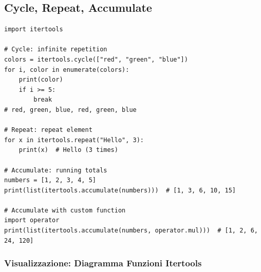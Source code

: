 \subsection{Cycle, Repeat, Accumulate}

\begin{lstlisting}
import itertools

# Cycle: infinite repetition
colors = itertools.cycle(["red", "green", "blue"])
for i, color in enumerate(colors):
    print(color)
    if i >= 5:
        break
# red, green, blue, red, green, blue

# Repeat: repeat element
for x in itertools.repeat("Hello", 3):
    print(x)  # Hello (3 times)

# Accumulate: running totals
numbers = [1, 2, 3, 4, 5]
print(list(itertools.accumulate(numbers)))  # [1, 3, 6, 10, 15]

# Accumulate with custom function
import operator
print(list(itertools.accumulate(numbers, operator.mul)))  # [1, 2, 6, 24, 120]
\end{lstlisting}

\subsubsection{Visualizzazione: Diagramma Funzioni Itertools}

